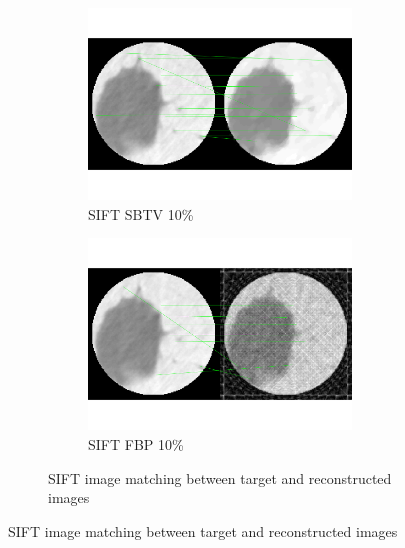 \documentclass[10pt,a4paper,titlepage]{article}
\begin{document}
\begin{figure}
\begin{figure}[H]
			\begin{subfigure}[b]{0.475\textwidth}
				\includegraphics[width=\textwidth]{Sample1/SIFT/SB/10p.png}
				\caption{SIFT SBTV 10\%}
			\end{subfigure}
			\begin{subfigure}[b]{0.475\textwidth}
				\includegraphics[width=\textwidth]{Sample1/SIFT/FBP/10p.png}
				\caption{SIFT FBP 10\%}
			\end{subfigure}
			\caption{SIFT image matching between target and reconstructed images}
			\label{fig:SIFTimg}
		\end{figure}
\end{figure}
\end{document}
